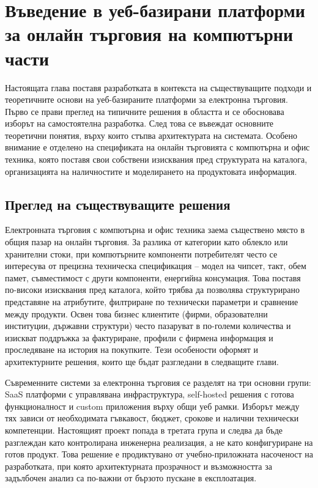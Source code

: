 \section{Въведение в уеб-базирани платформи за онлайн търговия на компютърни части}

Настоящата глава поставя разработката в контекста на съществуващите подходи и теоретичните основи на уеб-базираните платформи за електронна търговия. Първо се прави преглед на типичните решения в областта и се обосновава изборът на самостоятелна разработка. След това се въвеждат основните теоретични понятия, върху които стъпва архитектурата на системата. Особено внимание е отделено на спецификата на онлайн търговията с компютърна и офис техника, която поставя свои собствени изисквания пред структурата на каталога, организацията на наличностите и моделирането на продуктовата информация.

\subsection{Преглед на съществуващите решения}

Електронната търговия с компютърна и офис техника заема съществено място в общия пазар на онлайн търговия. За разлика от категории като облекло или хранителни стоки, при компютърните компоненти потребителят често се интересува от прецизна техническа спецификация -- модел на чипсет, такт, обем памет, съвместимост с други компоненти, енергийна консумация. Това поставя по-високи изисквания пред каталога, който трябва да позволява структурирано представяне на атрибутите, филтриране по технически параметри и сравнение между продукти. Освен това бизнес клиентите (фирми, образователни институции, държавни структури) често пазаруват в по-големи количества и изискват поддръжка за фактуриране, профили с фирмена информация и проследяване на история на покупките. Тези особености оформят и архитектурните решения, които ще бъдат разгледани в следващите глави.

Съвременните системи за електронна търговия се разделят на три основни групи: SaaS платформи с управлявана инфраструктура, self-hosted решения с готова функционалност и custom приложения върху общи уеб рамки. Изборът между тях зависи от необходимата гъвкавост, бюджет, срокове и налични технически компетенции. Настоящият проект попада в третата група и следва да бъде разглеждан като контролирана инженерна реализация, а не като конфигуриране на готов продукт. Това решение е продиктувано от учебно-приложната насоченост на разработката, при която архитектурната прозрачност и възможността за задълбочен анализ са по-важни от бързото пускане в експлоатация.

